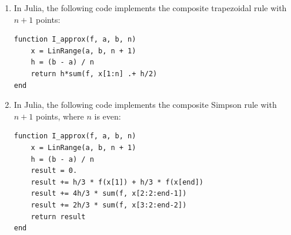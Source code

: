 \documentclass[a4paper]{article}
\begin{document}
\begin{enumerate}
    \item
        In Julia, the following code implements the composite trapezoidal rule with $n+1$ points:
        \begin{verbatim}
function I_approx(f, a, b, n)
    x = LinRange(a, b, n + 1)
    h = (b - a) / n
    return h*sum(f, x[1:n] .+ h/2)
end
        \end{verbatim}

    \item
        In Julia, the following code implements the composite Simpson rule with $n+1$ points,
        where $n$ is even:
        \begin{verbatim}
function I_approx(f, a, b, n)
    x = LinRange(a, b, n + 1)
    h = (b - a) / n
    result = 0.
    result += h/3 * f(x[1]) + h/3 * f(x[end])
    result += 4h/3 * sum(f, x[2:2:end-1])
    result += 2h/3 * sum(f, x[3:2:end-2])
    return result
end
        \end{verbatim}
\end{enumerate}

\ifdefined\showsolutions
\newpage
{}
\end{document}
